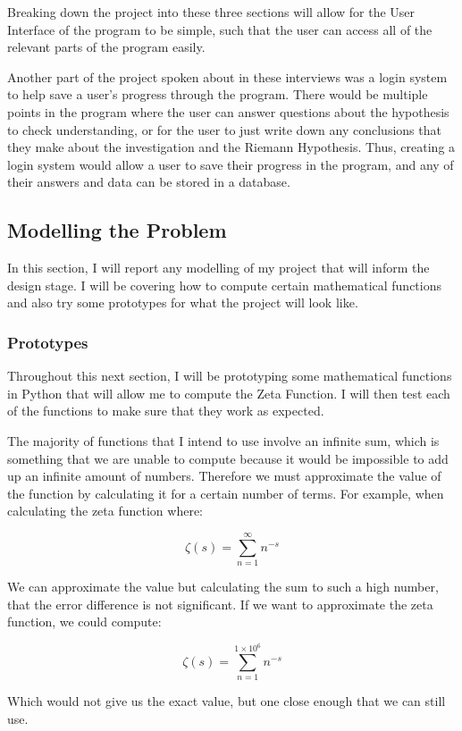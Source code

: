 \documentclass{article}
\begin{document}
Breaking down the project into these three sections will allow for the User Interface of the program to be simple, such that the user can access all of the relevant parts of the program easily.

Another part of the project spoken about in these interviews was a login system to help save a user's progress through the program. There would be multiple points in the program where the user can answer questions about the hypothesis to check understanding, or for the user to just write down any conclusions that they make about the investigation and the Riemann Hypothesis. Thus, creating a login system would allow a user to save their progress in the program, and any of their answers and data can be stored in a database.
\clearpage
\subsection{Modelling the Problem}
In this section, I will report any modelling of my project that will inform the design stage. I will be covering how to compute certain mathematical functions and also try some prototypes for what the project will look like.

\subsubsection{Prototypes}

Throughout this next section, I will be prototyping some mathematical functions in Python that will allow me to compute the Zeta Function. I will then test each of the functions to make sure that they work as expected.

The majority of functions that I intend to use involve an infinite sum, which is something that we are unable to compute because it would be impossible to add up an infinite amount of numbers. Therefore we must approximate the value of the function by calculating it for a certain number of terms. For example, when calculating the zeta function where:

$$\zeta(s) = \sum_{n=1}^{\infty} n^{-s}$$

We can approximate the value but calculating the sum to such a high number, that the error difference is not significant. If we want to approximate the zeta function, we could compute:

$$\zeta(s) = \sum_{n=1}^{1 \times 10^6} n^{-s}$$

Which would not give us the exact value, but one close enough that we can still use.
\end{document}
